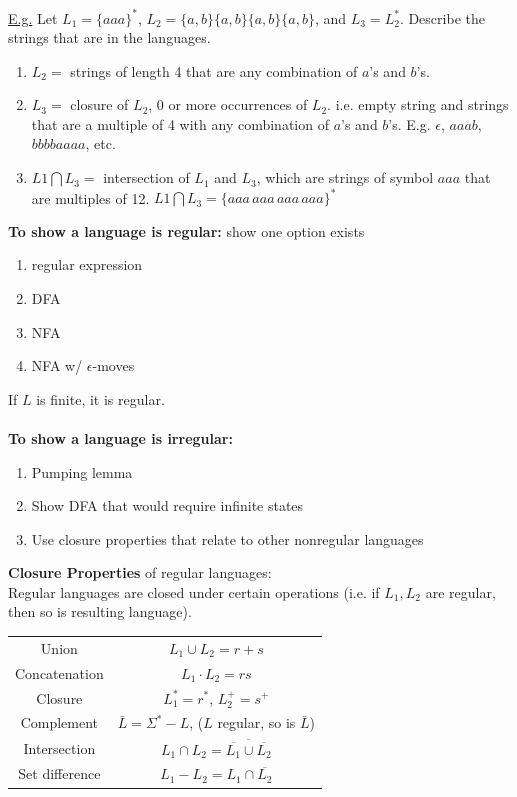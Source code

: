 \documentclass[8pt,letterpaper,twocolumn]{article}
\begin{document}
\underline{E.g.} Let $L_1 = \{aaa\}^*$, $L_2 = \{a,b\}\{a,b\}\{a,b\}\{a,b\}$, and $L_3 = L_2^*$.
Describe the strings that are in the languages.
\begin{enumerate}
  \item $L_2 =$ strings of length 4 that are any combination of $a$'s and $b$'s.
  \item $L_3 =$ closure of $L_2$, 0 or more occurrences of $L_2$.
  i.e. empty string and strings that are a multiple of 4 with any combination of $a$'s and $b$'s.
  E.g. $\epsilon$, $aaab$, $bbbbaaaa$, etc.
  \item $L1 \bigcap L_3 =$ intersection of $L_1$ and $L_3$, which are strings of symbol $aaa$
  that are multiples of 12. $L1 \bigcap L_3 = \{aaa\,aaa\,aaa\,aaa\}^*$
\end{enumerate}
\textbf{To show a language is regular:} show one option exists
\begin{enumerate}
\item regular expression
\item DFA
\item NFA
\item NFA w/ $\epsilon$-moves
\end{enumerate}
If $L$ is finite, it is regular.\\
\\
\textbf{To show a language is irregular:}
\begin{enumerate}
\item Pumping lemma
\item Show DFA that would require infinite states
\item Use closure properties that relate to other nonregular languages
\end{enumerate}
\textbf{Closure Properties} of regular languages:\\
Regular languages are closed under certain operations
(i.e. if $L_1, L_2$ are regular, then so is resulting language).
\begin{tabular}{|c|c|}
\hline 
Union & $L_1 \cup L_2 = r + s$ \\ 
Concatenation & $L_1 \cdot L_2 = rs$ \\ 
Closure & $L_1^* = r^*$, $L_2^+ = s^+$ \\
Complement & $\bar{L} = \Sigma^* - L$, ($L$ regular, so is $\bar{L}$)\\
Intersection & $L_1 \cap L_2 = \overline{\overline{L_1} \cup \overline{L_2}}$ \\
Set difference & $L_1 - L_2 = L_1 \cap \overline{L_2}$ \\
\hline 
\end{tabular} \\
\end{document}
